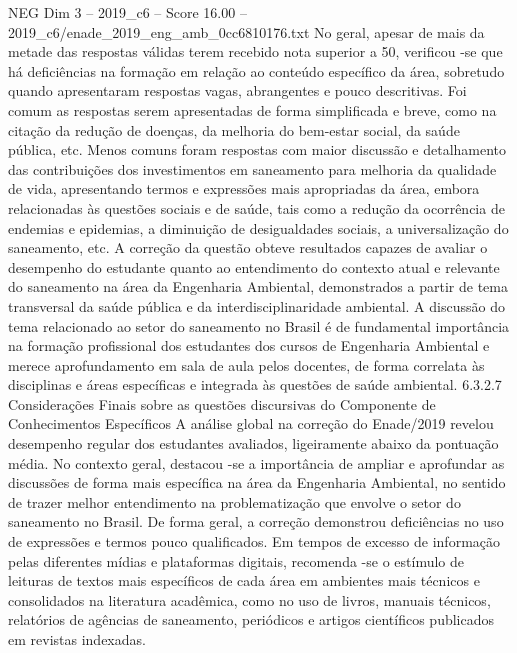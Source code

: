\begin{textsample}{NEG Dim 3 – 2019\_c6 – Score 16.00 – 2019\_c6/enade\_2019\_eng\_amb\_0cc6810176.txt}
No geral, apesar de mais da metade das respostas válidas terem recebido nota superior a 50, verificou -se que há deficiências na formação em relação ao conteúdo específico da área, sobretudo quando apresentaram respostas vagas, abrangentes e pouco descritivas.
Foi comum as respostas serem apresentadas de forma simplificada e breve, como na citação da redução de doenças, da melhoria do bem-estar social, da saúde pública, etc.
Menos comuns foram respostas com maior discussão e detalhamento das contribuições dos investimentos em saneamento para melhoria da qualidade de vida, apresentando termos e expressões mais apropriadas da área, embora relacionadas às questões sociais e de saúde, tais como a redução da ocorrência de endemias e epidemias, a diminuição de desigualdades sociais, a universalização do saneamento, etc.
A correção da questão obteve resultados capazes de avaliar o desempenho do estudante quanto ao entendimento do contexto atual e relevante do saneamento na área da Engenharia Ambiental, demonstrados a partir de tema transversal da saúde pública e da interdisciplinaridade ambiental.
A discussão do tema relacionado ao setor do saneamento no Brasil é de fundamental importância na formação profissional dos estudantes dos cursos de Engenharia Ambiental e merece aprofundamento em sala de aula pelos docentes, de forma correlata às disciplinas e áreas específicas e integrada às questões de saúde ambiental. 6.3.2.7 Considerações Finais sobre as questões discursivas do Componente de Conhecimentos Específicos A análise global na correção do Enade/2019 revelou desempenho regular dos estudantes avaliados, ligeiramente abaixo da pontuação média.
No contexto geral, destacou -se a importância de ampliar e aprofundar as discussões de forma mais específica na área da Engenharia Ambiental, no sentido de trazer melhor entendimento na problematização que envolve o setor do saneamento no Brasil.
De forma geral, a correção demonstrou deficiências no uso de expressões e termos pouco qualificados.
Em tempos de excesso de informação pelas diferentes mídias e plataformas digitais, recomenda -se o estímulo de leituras de textos mais específicos de cada área em ambientes mais técnicos e consolidados na literatura acadêmica, como no uso de livros, manuais técnicos, relatórios de agências de saneamento, periódicos e artigos científicos publicados em revistas indexadas.

\end{textsample}
